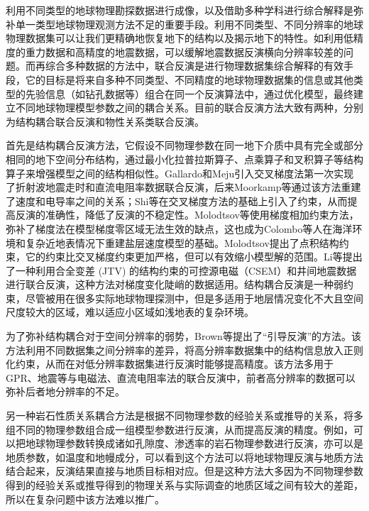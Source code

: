 利用不同类型的地球物理勘探数据进行成像，以及借助多种学科进行综合解释是弥补单一类型地球物理观测方法不足的重要手段。利用不同类型、不同分辨率的地球物理数据集可以让我们更精确地恢复地下的结构以及揭示地下的特性。如利用低精度的重力数据和高精度的地震数据，可以缓解地震数据反演横向分辨率较差的问题\cite{lelievre2012joint}。而再综合多种数据的方法中，联合反演是进行物理数据集综合解释的有效手段，它的目标是将来自多种不同类型、不同精度的地球物理数据集的信息或其他类型的先验信息（如钻孔数据等）组合在同一个反演算法中，通过优化模型，最终建立不同地球物理模型参数之间的耦合关系。目前的联合反演方法大致有两种，分别为结构耦合联合反演和物性关系类联合反演。

首先是结构耦合反演方法，它假设不同物理参数在同一地下介质中具有完全或部分相同的地下空间分布结构，通过最小化拉普拉斯算子、点乘算子和叉积算子等结构算子来增强模型之间的结构相似性\cite{haber1997joint}。Gallardo和Meju引入交叉梯度法第一次实现了折射波地震走时和直流电阻率数据联合反演\cite{gallardo2003characterization}，后来Moorkamp等通过该方法重建了速度和电导率之间的关系\cite{moorkamp2013verification}；Shi等在交叉梯度方法的基础上引入了约束，从而提高反演的准确性，降低了反演的不稳定性\cite{shi20173}。Molodtsov等使用梯度相加约束方法，弥补了梯度法在模型梯度零区域无法生效的缺点\cite{moorkamp2013verification}，这也成为Colombo等人在海洋环境和复杂近地表情况下重建盐层速度模型的基础\cite{colombo2018coupling}。Molodtsov提出了点积结构约束，它的约束比交叉梯度约束更加严格，但可以有效缩小模型解的范围\cite{molodtsov2011joint}。Li等提出了一种利用合全变差 (JTV) 的结构约束的可控源电磁（CSEM）和井间地震数据进行联合反演，这种方法对梯度变化陡峭的数据适用\cite{li2019alternating}。结构耦合反演是一种弱约束，尽管被用在很多实际地球物理探测中，但是多适用于地层情况变化不大且空间尺度较大的区域，难以适应小区域如浅地表的复杂环境。

为了弥补结构耦合对于空间分辨率的弱势，Brown等提出了“引导反演”的方法。该方法利用不同数据集之间分辨率的差异，将高分辨率数据集中的结构信息放入正则化约束，从而在对低分辨率数据集进行反演时能够提高精度。该方法多用于GPR、地震等与电磁法、直流电阻率法的联合反演中，前者高分辨率的数据可以弥补后者地分辨率的不足\cite{zhou2014image}。

另一种岩石性质关系耦合方法是根据不同物理参数的经验关系或推导的关系，将多组不同的物理参数组合成一组模型参数进行反演，从而提高反演的精度。例如，可以把地球物理参数转换成诸如孔隙度、渗透率的岩石物理参数进行反演\cite{hauck2011new}，亦可以是地质参数，如温度和地幔成分\cite{afonso2016imaging}，可以看到这个方法可以将地球物理反演与地质方法结合起来，反演结果直接与地质目标相对应。但是这种方法大多因为不同物理参数得到的经验关系或推导得到的物理关系与实际调查的地质区域之间有较大的差距，所以在复杂问题中该方法难以推广。

